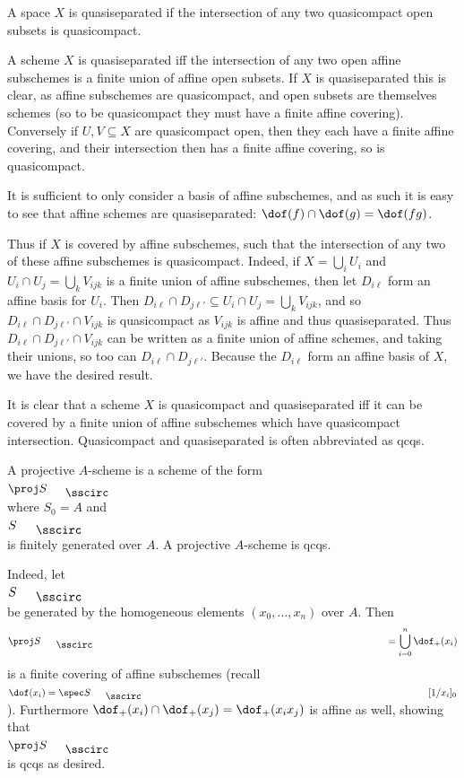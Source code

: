 \eremark

\bdefn

    A space $X$ is {\emphcolor quasiseparated} if the intersection of any two quasicompact open subsets is quasicompact.

\edefn

A scheme $X$ is quasiseparated iff the intersection of any two open affine subschemes is a finite union of affine open subsets.
If $X$ is quasiseparated this is clear, as affine subschemes are quasicompact, and open subsets are themselves schemes (so to be quasicompact they must have a finite affine covering).
Conversely if $U,V\subseteq X$ are quasicompact open, then they each have a finite affine covering, and their intersection then has a finite affine covering, so is quasicompact.

It is sufficient to only consider a basis of affine subschemes, and as such it is easy to see that affine schemes are quasiseparated: $\dof(f)\cap\dof(g)=\dof(fg)$.

Thus if $X$ is covered by affine subschemes, such that the intersection of any two of these affine subschemes is quasicompact.
Indeed, if $X=\bigcup_iU_i$ and $U_i\cap U_j=\bigcup_kV_{ijk}$ is a finite union of affine subschemes, then let $D_{i\ell}$ form an affine basis for $U_i$.
Then $D_{i\ell}\cap D_{j\ell'}\subseteq U_i\cap U_j=\bigcup_kV_{ijk}$, and so $D_{i\ell}\cap D_{j\ell'}\cap V_{ijk}$ is quasicompact as $V_{ijk}$ is affine and thus quasiseparated.
Thus $D_{i\ell}\cap D_{j\ell'}\cap V_{ijk}$ can be written as a finite union of affine schemes, and taking their unions, so too can $D_{i\ell}\cap D_{j\ell'}$.
Because the $D_{i\ell}$ form an affine basis of $X$, we have the desired result.

It is clear that a scheme $X$ is quasicompact and quasiseparated iff it can be covered by a finite union of affine subschemes which have quasicompact intersection.
Quasicompact and quasiseparated is often abbreviated as {\emphcolor qcqs}.

\bexam

    A {\emphcolor projective $A$-scheme} is a scheme of the form $\proj S_\bul$ where $S_0=A$ and $S_\bul$ is finitely generated over $A$.
    A projective $A$-scheme is qcqs.

    Indeed, let $S_\bul$ be generated by the homogeneous elements $(x_0,\dots,x_n)$ over $A$.
    Then
    $$ \proj S_\bul = \bigcup_{i=0}^n\dof_+(x_i) $$
    is a finite covering of affine subschemes (recall $\dof(x_i)=\spec S_\bul[1/x_i]_0$).
    Furthermore $\dof_+(x_i)\cap\dof_+(x_j)=\dof_+(x_ix_j)$ is affine as well, showing that $\proj S_\bul$ is qcqs as desired.

